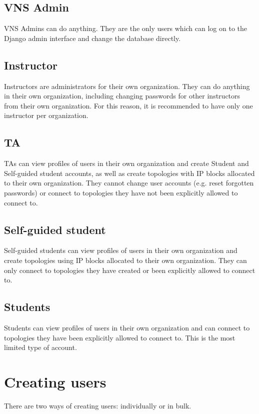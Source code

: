\documentclass[a4paper,12pt]{report}
\begin{document}
\subsection{VNS Admin}
VNS Admins can do anything.  They are the only users which can log on to the Django admin interface and change the database directly.

\subsection{Instructor}
Instructors are administrators for their own organization.  They can do anything in their own organization, including changing passwords for other instructors from their own organization.  For this reason, it is recommended to have only one instructor per organization.

\subsection{TA}
TAs can view profiles of users in their own organization and create Student and Self-guided student accounts, as well as create topologies with IP blocks allocated to their own organization.  They cannot change user accounts (e.g. reset forgotten passwords) or connect to topologies they have not been explicitly allowed to connect to.

\subsection{Self-guided student}
Self-guided students can view profiles of users in their own organization and create topologies using IP blocks allocated to their own organization.  They can only connect to topologies they have created or been explicitly allowed to connect to.

\subsection{Students}
Students can view profiles of users in their own organization and can connect to topologies they have been explicitly allowed to connect to.  This is the most limited type of account.


\section{Creating users}
There are two ways of creating users: individually or in bulk.
\end{document}

